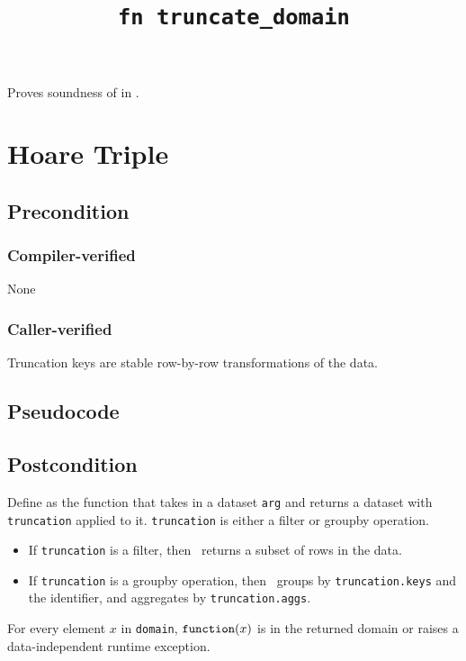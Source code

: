 \documentclass{article}
\title{\texttt{fn truncate\_domain}}
\author{\MichaelShoemateAuthor}
\begin{document}
\maketitle


\contrib

Proves soundness of 
in .

\section{Hoare Triple}
\subsection*{Precondition}
\subsubsection*{Compiler-verified}
None

\subsubsection*{Caller-verified}
Truncation keys are stable row-by-row transformations of the data.

\subsection*{Pseudocode}
\label{sec:python-pseudocode}


\subsection*{Postcondition}
\begin{theorem}[Postcondition]
    Define \function as the function that takes in a dataset \texttt{arg} and returns a dataset with \texttt{truncation} applied to it.
    \texttt{truncation} is either a filter or groupby operation.
    \begin{itemize}
        \item If \texttt{truncation} is a filter, then \function\ returns a subset of rows in the data.
        \item If \texttt{truncation} is a groupby operation, then \function\ groups by \texttt{truncation.keys} and the identifier, and aggregates by \texttt{truncation.aggs}.
    \end{itemize}

    For every element $x$ in \texttt{domain}, $\texttt{function}(x)$ is in the returned domain or raises a data-independent runtime exception.
\end{theorem}
\end{document}
